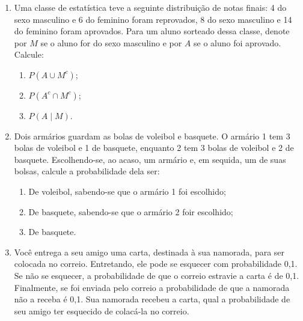 \documentclass[12pt, a4paper]{article}
\begin{document}
\begin{enumerate}
\item Uma classe de estatística teve a seguinte distribuição de notas finais: 4 do sexo masculino e 6 do feminino foram reprovados, 8 do sexo masculino e 14 do feminino foram aprovados. Para um aluno sorteado dessa classe, denote por $M$ se o aluno for do sexo masculino e por $A$ se o aluno foi aprovado. Calcule:
\begin{enumerate}
	\item $P(A \cup M^c)$;
	\item $P(A^c \cap M^c)$;
	\item $P(A \mid M)$.
\end{enumerate}

\item Dois armários guardam as bolas de voleibol e basquete. O armário 1 tem 3 bolas de voleibol e 1 de basquete, enquanto 2 tem 3 bolas de voleibol e 2 de basquete. Escolhendo-se, ao acaso, um armário e, em sequida, um de suas bolsas, calcule a probabilidade dela ser:
\begin{enumerate}
	\item De voleibol, sabendo-se que o armário 1 foi escolhido;
	\item De basquete, sabendo-se que o armário 2 foir escolhido;
	\item De basquete.
\end{enumerate}


\item Você entrega a seu amigo uma carta, destinada à sua namorada, para ser colocada no correio. Entretando, ele pode se esquecer com probabilidade 0,1. Se não se esquecer, a probabilidade de que o correio estravie a carta é de 0,1. Finalmente, se foi enviada pelo correio a probabilidade de que a namorada não a receba é 0,1. Sua namorada recebeu a carta, qual a probabilidade de seu amigo ter esquecido de colacá-la no correio.


\end{enumerate}
\end{document}
